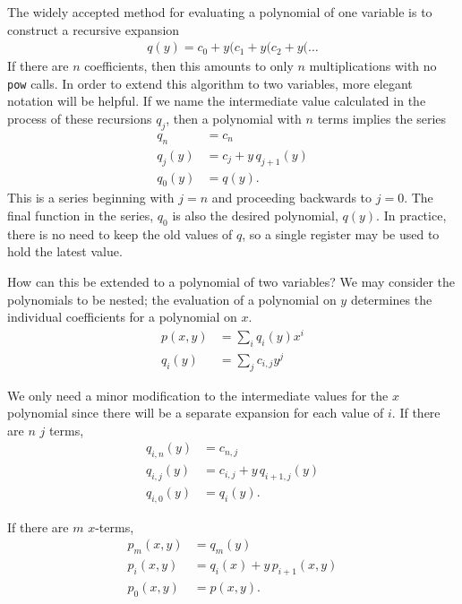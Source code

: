 The widely accepted method for evaluating a polynomial of one variable is to construct a recursive expansion
\begin{align}
q(y) = c_0 + y ( c_1 + y ( c_2 + y ( \ldots
\end{align}
If there are $n$ coefficients, then this amounts to only $n$ multiplications with no \verb|pow| calls.  In order to extend this algorithm to two variables, more elegant notation will be helpful.  If we name the intermediate value calculated in the process of these recursions $q_j$, then a polynomial with $n$ terms implies the series
\begin{align}
q_n &= c_n\\
q_j(y) &= c_j + y\,q_{j+1}(y)\\
q_0(y) &= q(y).
\end{align}
This is a series beginning with $j=n$ and proceeding backwards to $j=0$.  The final function in the series, $q_0$ is also the desired polynomial, $q(y)$.  In practice, there is no need to keep the old values of $q$, so a single register may be used to hold the latest value.

How can this be extended to a polynomial of two variables?  We may consider the polynomials to be nested; the evaluation of a polynomial on $y$ determines the individual coefficients for a polynomial on $x$.
\begin{align}
p(x,y) &= \sum_i q_i(y) x^i\\
q_i(y) &= \sum_j c_{i,j} y^j
\end{align}

We only need a minor modification to the intermediate values for the $x$ polynomial since there will be a separate expansion for each value of $i$.  If there are $n$ $j$ terms,
\begin{subequations}
\begin{align}
q_{i,n}(y) &= c_{n,j}\\
q_{i,j}(y) &= c_{i,j} + y\,q_{i+1,j}(y)\\
q_{i,0}(y) &= q_i(y).
\end{align}
\end{subequations}

If there are $m$ $x$-terms,
\begin{subequations}
\begin{align}
p_m(x,y) &= q_m(y)\\
p_i(x,y) &= q_i(x) + y\,p_{i+1}(x,y)\\
p_0(x,y) &= p(x,y).
\end{align}
\end{subequations}

